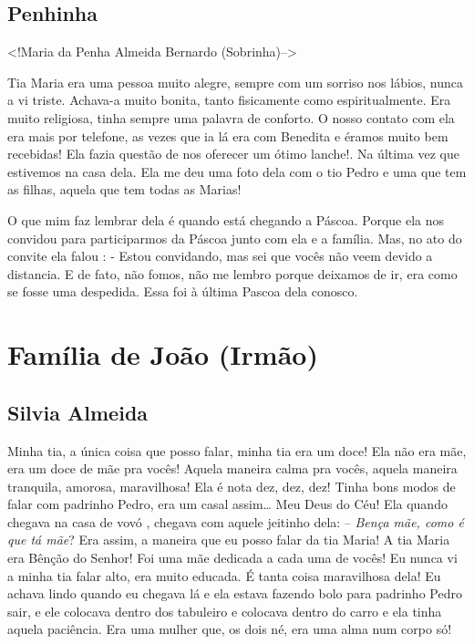 \documentclass[
  brazil,
  a6paper,
  oneside,
  landscape,
  14pt]{scrbook}
\begin{document}
\hypertarget{penhinha}{%
\section{Penhinha}\label{penhinha}}

\textless!Maria da Penha Almeida Bernardo (Sobrinha)--\textgreater{}

Tia Maria era uma pessoa muito alegre, sempre com um sorriso nos lábios,
nunca a vi triste. Achava-a muito bonita, tanto fisicamente como
espiritualmente. Era muito religiosa, tinha sempre uma palavra de
conforto. O nosso contato com ela era mais por telefone, as vezes que ia
lá era com Benedita e éramos muito bem recebidas! Ela fazia questão de
nos oferecer um ótimo lanche!. Na última vez que estivemos na casa dela.
Ela me deu uma foto dela com o tio Pedro e uma que tem as filhas, aquela
que tem todas as Marias!

O que mim faz lembrar dela é quando está chegando a Páscoa. Porque ela
nos convidou para participarmos da Páscoa junto com ela e a família.
Mas, no ato do convite ela falou : - Estou convidando, mas sei que vocês
não veem devido a distancia. E de fato, não fomos, não me lembro porque
deixamos de ir, era como se fosse uma despedida. Essa foi à última
Pascoa dela conosco.

\hypertarget{famuxedlia-de-jouxe3o-irmuxe3o}{%
\chapter{Família de João (Irmão)}\label{famuxedlia-de-jouxe3o-irmuxe3o}}

\hypertarget{silvia-almeida}{%
\section{Silvia Almeida}\label{silvia-almeida}}

Minha tia, a única coisa que posso falar, minha tia era um doce! Ela não
era mãe, era um doce de mãe pra vocês! Aquela maneira calma pra vocês,
aquela maneira tranquila, amorosa, maravilhosa! Ela é nota dez, dez,
dez! Tinha bons modos de falar com padrinho Pedro, era um casal
assim\ldots{} Meu Deus do Céu! Ela quando chegava na casa de vovó ,
chegava com aquele jeitinho dela: -- \emph{Bença mãe, como é que tá
mãe}? Era assim, a maneira que eu posso falar da tia Maria! A tia Maria
era Bênção do Senhor! Foi uma mãe dedicada a cada uma de vocês! Eu nunca
vi a minha tia falar alto, era muito educada. É tanta coisa maravilhosa
dela! Eu achava lindo quando eu chegava lá e ela estava fazendo bolo
para padrinho Pedro sair, e ele colocava dentro dos tabuleiro e colocava
dentro do carro e ela tinha aquela paciência. Era uma mulher que, os
dois né, era uma alma num corpo só!
\end{document}
